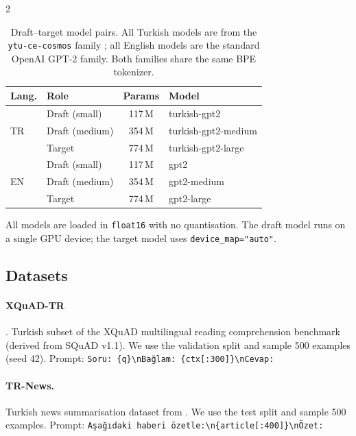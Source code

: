 \documentclass[11pt,a4paper]{article}
\begin{document}
\begin{multicols}{2}
\begin{table}[t]
\centering
\small
\begin{tabular}{llcl}
\toprule
\textbf{Lang.} & \textbf{Role} & \textbf{Params} & \textbf{Model} \\
\midrule
\multirow{3}{*}{TR}
  & Draft (small)  & 117\,M & turkish-gpt2        \\
  & Draft (medium) & 354\,M & turkish-gpt2-medium \\
  & Target         & 774\,M & turkish-gpt2-large  \\
\midrule
\multirow{3}{*}{EN}
  & Draft (small)  & 117\,M & gpt2                \\
  & Draft (medium) & 354\,M & gpt2-medium         \\
  & Target         & 774\,M & gpt2-large          \\
\bottomrule
\end{tabular}
\caption{Draft–target model pairs. All Turkish models are from the
\texttt{ytu-ce-cosmos} family \citep{safaya2022mukayese}; all English
models are the standard OpenAI GPT-2 family.
Both families share the same BPE tokenizer.}
\label{tab:models}
\end{table}

All models are loaded in \texttt{float16} with no quantisation.
The draft model runs on a single GPU device; the target model uses
\texttt{device\_map="auto"}.

\subsection{Datasets}

\paragraph{XQuAD-TR} \citep{artetxe2020cross}.
Turkish subset of the XQuAD multilingual reading comprehension benchmark
(derived from SQuAD v1.1).
We use the validation split and sample 500 examples (seed 42).
Prompt: \texttt{Soru: \{q\}\textbackslash{}nBağlam: \{ctx[:300]\}\textbackslash{}nCevap:}

\paragraph{TR-News.}
Turkish news summarisation dataset from \citet{baykara2022abstractive}.
We use the test split and sample 500 examples.
Prompt: \texttt{Aşağıdaki haberi özetle:\textbackslash{}n\{article[:400]\}\textbackslash{}nÖzet:}


\end{multicols}
\end{document}

